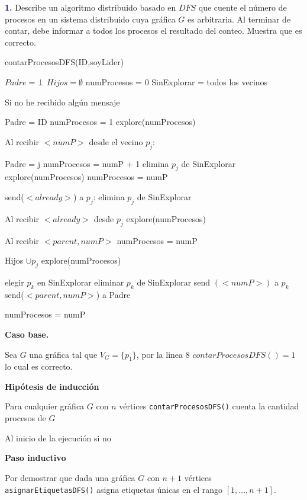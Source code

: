 \newpage
\textbf{\textcolor{MidnightBlue}{1.}}
Describe un algoritmo distribuido basado en $DFS$ que cuente el número de procesos
en un sistema distribuido cuya gráfica $G$ es arbitraria. Al terminar de contar, debe informar a todos
los procesos el resultado del conteo. Muestra que es correcto.


\begin{algorithm}
\caption{contarProcesosDFS(ID,soyLider)}
\begin{algorithmic}[1]
\State $Padre = \bot$
\State $Hijos = \emptyset$
\State numProcesos = 0
\State SinExplorar = todos los vecinos

\State Si no he recibido algún mensaje

    \State Padre = ID
    \State numProcesos = 1
    \State explore(numProcesos)
\EndIf

\State Al recibir $<numP>$ desde el vecino $p_j$:

    \State Padre = j
    \State numProcesos = numP + 1 
    \State elimina $p_j$ de SinExplorar
    \State explore(numProcesos)
\Else
        \State numProcesos = numP
    \EndIf

    \State send($<already>$) a $p_j$:
    \State elimina $p_j$ de SinExplorar
\EndIf

\State Al recibir $<already>$ desde $p_j$
    \State explore(numProcesos)

\State Al recibir $<parent,numP>$
        \State numProcesos = numP
    \EndIf

    \State Hijos $\cup {p_j}$
    \State explore(numProcesos)


        \State elegir $p_k$ en SinExplorar
        \State eliminar $p_k$ de SinExplorar
        \State send $(<numP>)$ a $p_k$
    \Else
            \State send($<parent, numP>$) a Padre
        \EndIf
        
            \State numProcesos = numP
        \EndIf
    \EndIf
\EndProcedure
\end{algorithmic}
\end{algorithm}

\textbf{Caso base.} 

Sea $G$ una gráfica tal que $V_G=\{p_1\}$, por la linea 8 $contarProcesosDFS()= 1 $ lo cual es correcto.

\textbf{Hipótesis de inducción}

Para cualquier gráfica $G$ con $n$ vértices {\tt contarProcesosDFS()} cuenta la cantidad procesos de $G$

Al inicio de la ejecución si no

\textbf{Paso inductivo}

Por demostrar que dada una gráfica $G$ con $n+1$ vértices {\tt asignarEtiquetasDFS()} asigna etiquetas únicas en el rango $[1,\dots, n+1]$.